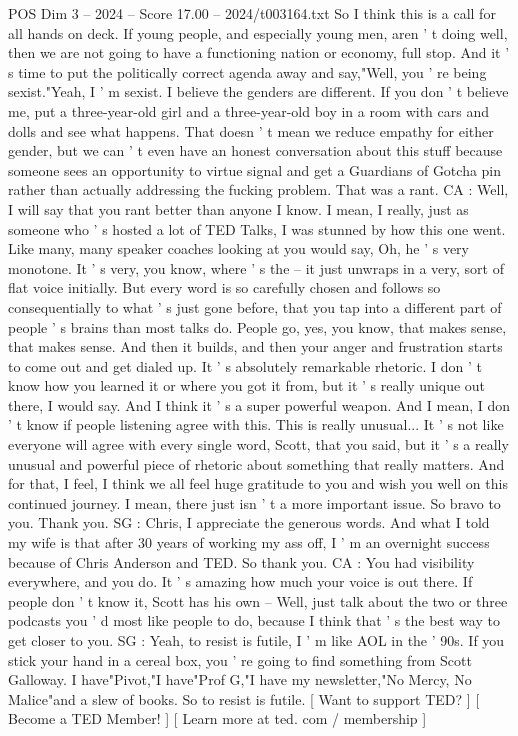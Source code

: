 \begin{textsample}{POS Dim 3 – 2024 – Score 17.00 – 2024/t003164.txt}
So I think this is a call for all hands on deck.
If young people, and especially young men, aren ' t doing well, then we are not going to have a functioning nation or economy, full stop.
And it ' s time to put the politically correct agenda away and say,"Well, you ' re being sexist."Yeah, I ' m sexist.
I believe the genders are different.
If you don ' t believe me, put a three-year-old girl and a three-year-old boy in a room with cars and dolls and see what happens.
That doesn ' t mean we reduce empathy for either gender, but we can ' t even have an honest conversation about this stuff because someone sees an opportunity to virtue signal and get a Guardians of Gotcha pin rather than actually addressing the fucking problem.
That was a rant.
CA : Well, I will say that you rant better than anyone I know.
I mean, I really, just as someone who ' s hosted a lot of TED Talks, I was stunned by how this one went.
Like many, many speaker coaches looking at you would say, Oh, he ' s very monotone.
It ' s very, you know, where ' s the -- it just unwraps in a very, sort of flat voice initially.
But every word is so carefully chosen and follows so consequentially to what ' s just gone before, that you tap into a different part of people ' s brains than most talks do.
People go, yes, you know, that makes sense, that makes sense.
And then it builds, and then your anger and frustration starts to come out and get dialed up.
It ' s absolutely remarkable rhetoric.
I don ' t know how you learned it or where you got it from, but it ' s really unique out there, I would say.
And I think it ' s a super powerful weapon.
And I mean, I don ' t know if people listening agree with this.
This is really unusual...
It ' s not like everyone will agree with every single word, Scott, that you said, but it ' s a really unusual and powerful piece of rhetoric about something that really matters.
And for that, I feel, I think we all feel huge gratitude to you and wish you well on this continued journey.
I mean, there just isn ' t a more important issue.
So bravo to you.
Thank you.
SG : Chris, I appreciate the generous words.
And what I told my wife is that after 30 years of working my ass off, I ' m an overnight success because of Chris Anderson and TED.
So thank you.
CA : You had visibility everywhere, and you do.
It ' s amazing how much your voice is out there.
If people don ' t know it, Scott has his own -- Well, just talk about the two or three podcasts you ' d most like people to do, because I think that ' s the best way to get closer to you.
SG : Yeah, to resist is futile, I ' m like AOL in the ' 90s.
If you stick your hand in a cereal box, you ' re going to find something from Scott Galloway.
I have"Pivot,"I have"Prof G,"I have my newsletter,"No Mercy, No Malice"and a slew of books.
So to resist is futile. [ Want to support TED? ] [ Become a TED Member! ] [ Learn more at ted. com / membership ]

\end{textsample}
